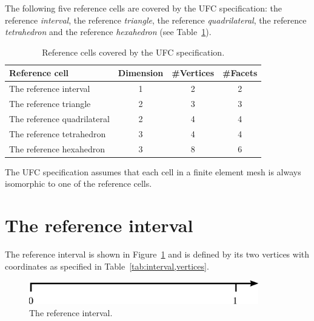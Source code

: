 
The following five reference cells are covered by the UFC specification:
the reference \emph{interval},
the reference \emph{triangle},
the reference \emph{quadrilateral},
the reference \emph{tetrahedron} and
the reference \emph{hexahedron} (see Table~\ref{tab:ufc_reference_cells}).

\begin{table}
\linespread{1.2}\selectfont
  \begin{center}
    \begin{tabular}{|l|c|c|c|}
      \hline
      Reference cell & Dimension & \#Vertices & \#Facets \\
      \hline
      \hline
      The reference interval      & 1 & 2 & 2 \\
      \hline
      The reference triangle      & 2 & 3 & 3 \\
      \hline
      The reference quadrilateral & 2 & 4 & 4 \\
      \hline
      The reference tetrahedron   & 3 & 4 & 4 \\
      \hline
      The reference hexahedron    & 3 & 8 & 6 \\
      \hline
    \end{tabular}
    \caption{Reference cells covered by the UFC specification.}
    \label{tab:ufc_reference_cells}
  \end{center}
\end{table}

The UFC specification assumes that each cell in a finite element mesh
is always isomorphic to one of the reference cells.

\section{The reference interval}

The reference interval is shown in Figure~\ref{fig:interval} and is
defined by its two vertices with coordinates as specified in
Table~\ref{tab:interval,vertices}.

\begin{figure}
  \begin{center}
    \includegraphics[width=10cm]{eps/interval.eps}
    \caption{The reference interval.}
    \label{fig:interval}
  \end{center}
\end{figure}

